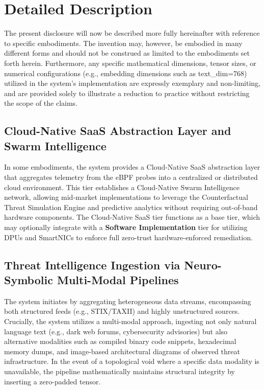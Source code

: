 \documentclass[12pt, letterpaper]{article}
\begin{document}
\section{Detailed Description}
The present disclosure will now be described more fully hereinafter with reference to specific embodiments. The invention may, however, be embodied in many different forms and should not be construed as limited to the embodiments set forth herein. Furthermore, any specific mathematical dimensions, tensor sizes, or numerical configurations (e.g., embedding dimensions such as text\_dim=768) utilized in the system's implementation are expressly exemplary and non-limiting, and are provided solely to illustrate a reduction to practice without restricting the scope of the claims. 

\subsection{Cloud-Native SaaS Abstraction Layer and Swarm Intelligence}
In some embodiments, the system provides a Cloud-Native SaaS abstraction layer that aggregates telemetry from the eBPF probes into a centralized or distributed cloud environment. This tier establishes a Cloud-Native Swarm Intelligence network, allowing mid-market implementations to leverage the Counterfactual Threat Simulation Engine and predictive analytics without requiring out-of-band hardware components. The Cloud-Native SaaS tier functions as a base tier, which may optionally integrate with a \textbf{Software Implementation} tier for utilizing DPUs and SmartNICs to enforce full zero-trust hardware-enforced remediation.

\subsection{Threat Intelligence Ingestion via Neuro-Symbolic Multi-Modal Pipelines}
The system initiates by aggregating heterogeneous data streams, encompassing both structured feeds (e.g., STIX/TAXII) and highly unstructured sources. Crucially, the system utilizes a multi-modal approach, ingesting not only natural language text (e.g., dark web forums, cybersecurity advisories) but also alternative modalities such as compiled binary code snippets, hexadecimal memory dumps, and image-based architectural diagrams of observed threat infrastructure. In the event of a topological void where a specific data modality is unavailable, the pipeline mathematically maintains structural integrity by inserting a zero-padded tensor. 
\end{document}
